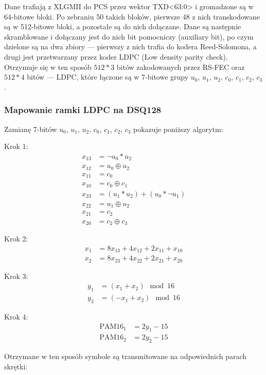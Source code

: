 Dane trafiają z XLGMII do PCS przez wektor TXD<63:0> i gromadzone są w 64-bitowe bloki. Po zebraniu 50 takich bloków, pierwsze 48 z nich transkodowane są w 512-bitowe bloki, a pozostałe są do nich dołączane. Dane są następnie skramblowane i dołączany jest do nich bit pomocniczy (auxiliary bit), po czym dzielone są na dwa zbiory --- pierwszy z nich trafia do kodera Reed-Solomona, a drugi jest przetwarzany przez koder LDPC (Low density parity check). Otrzymuje się w ten sposób $512*3$ bitów zakodowanych przez RS-FEC oraz $512*4$ bitów --- LDPC, które łączone są w 7-bitowe grupy  $u_0$, $u_1$, $u_2$, $c_0$, $c_1$, $c_2$, $c_3$.


\subsubsection{Mapowanie ramki LDPC na DSQ128}
Zamianę 7-bitów $u_0$, $u_1$, $u_2$, $c_0$, $c_1$, $c_2$, $c_3$ pokazuje poniższy algorytm:

Krok 1:
\begin{align*}
    x_{13} &= \neg u_0 * u_2 \\
    x_{12} &= u_0 \oplus u_2 \\
    x_{11} &= c_0 \\
    x_{10} &= c_0 \oplus c_1 \\
    x_{23} &= (u_1 * u_2) + (u_0 * \neg u_1) \\
    x_{22} &= u_1 \oplus u_2 \\
    x_{21} &= c_2 \\
    x_{20} &= c_2 \oplus c_3
\end{align*}

Krok 2:
\begin{align*}
    x_1 &= 8x_{13} + 4x_{12} + 2x_{11} + x_{10} \\
    x_2 &= 8x_{23} + 4x_{22} + 2x_{21} + x_{20}
\end{align*}

Krok 3:
\begin{align*}
    y_1 &= (x_1 + x_2) \mod 16 \\
    y_2 &= (-x_1 + x_2) \mod 16
\end{align*}

Krok 4:
\begin{align*}
    \text{PAM16}_1 &= 2y_1 - 15 \\
    \text{PAM16}_2 &= 2y_2 - 15
\end{align*}

Otrzymane w ten sposób symbole są transmitowane na odpowiednich parach skrętki:

